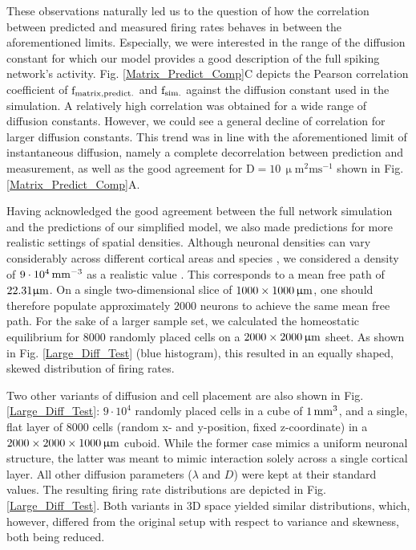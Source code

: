 \documentclass[10pt,letterpaper]{article}
\begin{document}
These observations naturally led us to the question of how the correlation between predicted and measured firing rates behaves in between the aforementioned limits. Especially, we were interested in the range of the diffusion constant for which our model provides a good description of the full spiking network's activity. Fig. \ref{Matrix_Predict_Comp}C depicts the Pearson correlation coefficient of $\mathrm{f_{\rm matrix, predict.}}$ and $\mathrm{f_{\rm sim.}}$ against the diffusion constant used in the simulation. A relatively high correlation was obtained for a wide range of diffusion constants. However, we could see a general decline of correlation for larger diffusion constants. This trend was in line with the aforementioned limit of instantaneous diffusion, namely a complete decorrelation between prediction and measurement, as well as the good agreement for $\mathrm{D= 10\, \upmu m^2 ms^{-1}}$ shown in Fig. \ref{Matrix_Predict_Comp}A.

Having acknowledged the good agreement between the full network simulation and the predictions of our simplified model, we also made predictions for more realistic settings of spatial densities. Although neuronal densities can vary considerably across different cortical areas and species \cite{Collins_2010}, we considered a density of $\rm 9\cdot 10^4\, mm^{-3}$ as a realistic value \cite{Schuez_1989}. This corresponds to a mean free path of $\rm 22.31 \upmu m$. On a single two-dimensional slice of $\rm 1000 \times 1000\, \upmu m$, one should therefore populate approximately $2000$ neurons to achieve the same mean free path. For the sake of a larger sample set, we calculated the homeostatic equilibrium for $8000$ randomly placed cells on a $\rm 2000 \times 2000\, \upmu m$ sheet. As shown in Fig. \ref{Large_Diff_Test} (blue histogram), this resulted in an equally shaped, skewed distribution of firing rates.  

Two other variants of diffusion and cell placement are also shown in Fig. \ref{Large_Diff_Test}: $9\cdot 10^4$ randomly placed cells in a cube of $\rm 1\, mm^3$, and a single, flat layer of $8000$ cells (random x- and y-position, fixed z-coordinate) in a $\rm 2000 \times 2000 \times 1000 \, \upmu m$ cuboid. While the former case mimics a uniform neuronal structure, the latter was meant to mimic interaction solely across a single cortical layer. All other diffusion parameters ($\lambda$ and $D$) were kept at their standard values. The resulting firing rate distributions are depicted in Fig. \ref{Large_Diff_Test}. Both variants in 3D space yielded similar distributions, which, however, differed from the original setup with respect to variance and skewness, both being reduced.
\end{document}
